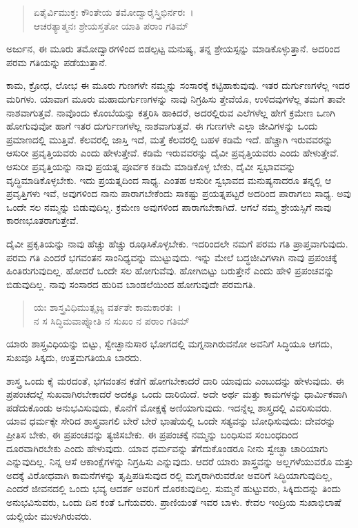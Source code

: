 \begin{verse}
ಏತೈರ್ವಿಮುಕ್ತಃ ಕೌಂತೇಯ ತಮೋದ್ವಾರೈಸ್ತ್ರಿಭಿರ್ನರಃ~।\\ಆಚರತ್ಯಾತ್ಮನಃ ಶ್ರೇಯಸ್ತತೋ ಯಾತಿ ಪರಾಂ ಗತಿಮ್ 
\end{verse}

{\small ಅರ್ಜುನ, ಈ ಮೂರು ತಮೋದ್ವಾರಗಳಿಂದ ಬಿಡಲ್ಪಟ್ಟ ಮನುಷ್ಯ, ತನ್ನ ಶ್ರೇಯಸ್ಸನ್ನು ಮಾಡಿಕೊಳ್ಳುತ್ತಾನೆ. ಅದರಿಂದ ಪರಮ ಗತಿಯನ್ನು ಪಡೆಯುತ್ತಾನೆ.}

ಕಾಮ, ಕ್ರೋಧ, ಲೋಭ ಈ ಮೂರು ಗುಣಗಳೇ ನಮ್ಮನ್ನು ಸಂಸಾರಕ್ಕೆ ಕಟ್ಟಿಹಾಕುವುವು. ಇತರ ದುರ್ಗುಣಗಳೆಲ್ಲ ಇದರ ಮರಿಗಳು. ಯಾವಾಗ ಮೂರು ಮಹಾದುರ್ಗುಣಗಳನ್ನು ನಾವು ನಿಗ್ರಹಿಸು ತ್ತೇವೆಯೊ, ಉಳಿದವುಗಳೆಲ್ಲ ತಮಗೆ ತಾವೇ ನಾಶವಾಗುತ್ತವೆ. ನಾವೊಂದು ಕೊಂಬೆಯನ್ನು ಕತ್ತರಿಸಿ ಹಾಕಿದರೆ, ಅದರಲ್ಲಿರುವ ಎಲೆಗಳೆಲ್ಲ ಹೇಗೆ ಕ್ರಮೇಣ ಒಣಗಿ ಹೋಗುವುವೋ ಹಾಗೆ ಇತರ ದುರ್ಗುಣಗಳೆಲ್ಲ ನಾಶವಾಗುತ್ತವೆ. ಈ ಗುಣಗಳೇ ಎಲ್ಲಾ ಜೀವಿಗಳನ್ನು ಒಂದು ಪ್ರಮಾಣದಲ್ಲಿ ಮುತ್ತಿವೆ. ಕೆಲವರಲ್ಲಿ ಜಾಸ್ತಿ ಇದೆ, ಮತ್ತೆ ಕೆಲವರಲ್ಲಿ ಬಹಳ ಕಡಿಮೆ ಇದೆ. ಹೆಚ್ಚಾಗಿ ಇರುವವರನ್ನು ಆಸುರೀ ಪ್ರವೃತ್ತಿಯವರು ಎಂದು ಹೇಳುತ್ತೇವೆ. ಕಡಿಮೆ ಇರುವವರನ್ನು ದೈವೀ ಪ್ರವೃತ್ತಿಯವರು ಎಂದು ಹೇಳುತ್ತೇವೆ. ಆಸುರೀ ಪ್ರವೃತ್ತಿಯನ್ನು ನಾವು ಪ್ರಯತ್ನ ಪೂರ್ವಕ ಕಡಿಮೆ ಮಾಡಿಕೊಳ್ಳ ಬೇಕು, ದೈವೀ ಸ್ವಭಾವವನ್ನು ವೃದ್ಧಿಮಾಡಿಕೊಳ್ಳಬೇಕು. ಇದು ಪ್ರಯತ್ನದಿಂದ ಸಾಧ್ಯ. ಎಂತಹ ಆಸುರೀ ಸ್ವಭಾವದ ಮನುಷ್ಯನಾದರೂ ತನ್ನಲ್ಲಿ ಆ ಪ್ರವೃತ್ತಿಗಳು ಇವೆ, ಅವುಗಳಿಂದ ನಾನು ಪಾರಾಗಬೇಕೆಂದು ಸಾಕಷ್ಟು ಪ್ರಯತ್ನಪಟ್ಟರೆ ಅದರಿಂದ ಪಾರಾಗಲು ಸಾಧ್ಯ. ಅವು ಒಂದೇ ಸಲ ನಮ್ಮನ್ನು ಬಿಡುವುದಿಲ್ಲ. ಕ್ರಮೇಣ ಅವುಗಳಿಂದ ಪಾರಾಗಬೇಕಾಗಿದೆ. ಆಗಲೆ ನಮ್ಮ ಶ್ರೇಯಸ್ಸಿಗೆ ನಾವು ಕಾರಣಭೂತರಾಗುತ್ತೇವೆ.

ದೈವೀ ಪ್ರಕೃತಿಯನ್ನು ನಾವು ಹೆಚ್ಚು ಹೆಚ್ಚು ರೂಢಿಸಿಕೊಳ್ಳಬೇಕು. ಇದರಿಂದಲೇ ನಮಗೆ ಪರಮ ಗತಿ ಪ್ರಾಪ್ತವಾಗುವುದು. ಪರಮ ಗತಿ ಎಂದರೆ ಭಗವಂತನ ಸಾಂನಿಧ್ಯವನ್ನು ಮುಟ್ಟುವುದು. ಇನ್ನು ಮೇಲೆ ಬದ್ಧಜೀವಿಗಳಾಗಿ ನಾವು ಪ್ರಪಂಚಕ್ಕೆ ಹಿಂತಿರುಗುವುದಿಲ್ಲ. ಹೋದರೆ ಒಂದೇ ಸಲ ಹೋಗುವೆವು. ಹೋಗಿಬಿಟ್ಟು ಬರುತ್ತೇನೆ ಎಂದು ಹೇಳಿ ಪ್ರಪಂಚವನ್ನು ಬಿಡುವುದಿಲ್ಲ. ನಾವು ಸಂಸಾರದ ಹುರಿವ ಬಾಂಡಲೆಯಿಂದ ಹೋಗುವುದೇ ಪರಮಗತಿ.

\begin{verse}
ಯಃ ಶಾಸ್ತ್ರವಿಧಿಮುತ್ಸೃಜ್ಯ ವರ್ತತೇ ಕಾಮಕಾರತಃ~।\\ನ ಸ ಸಿದ್ಧಿಮವಾಪ್ನೋತಿ ನ ಸುಖಂ ನ ಪರಾಂ ಗತಿಮ್ 
\end{verse}

{\small ಯಾರು ಶಾಸ್ತ್ರವಿಧಿಯನ್ನು ಬಿಟ್ಟು, ಸ್ವೇಚ್ಛಾನುಸಾರ ಭೋಗದಲ್ಲಿ ಮಗ್ನನಾಗಿರುವನೋ ಅವನಿಗೆ ಸಿದ್ಧಿಯೂ ಆಗದು, ಸುಖವೂ ಸಿಕ್ಕದು, ಉತ್ತಮಗತಿಯೂ ಬಾರದು.}

ಶಾಸ್ತ್ರ ಒಂದು ಕೈ ಮರದಂತೆ, ಭಗವಂತನ ಕಡೆಗೆ ಹೋಗಬೇಕಾದರೆ ದಾರಿ ಯಾವುದು ಎಂಬುದನ್ನು ಹೇಳುವುದು. ಈ ಪ್ರಪಂಚದಲ್ಲೆ ಸುಖವಾಗಿರಬೇಕಾದರೆ ಅದಕ್ಕೂ ಒಂದು ದಾರಿಯಿದೆ. ಅದೇ ಅರ್ಥ ಮತ್ತು ಕಾಮಗಳನ್ನು ಧಾರ್ಮಿಕವಾಗಿ ಪಡೆದುಕೊಂಡು ಅನುಭವಿಸುವುದು, ಕೊನೆಗೆ ಮೋಕ್ಷಕ್ಕೆ ಅಣಿಯಾಗುವುದು. ಇದನ್ನೆಲ್ಲ ಶಾಸ್ತ್ರದಲ್ಲಿ ವಿವರಿಸುವರು. ಯಾವ ಧರ್ಮಕ್ಕೇ ಸೇರಿದ ಶಾಸ್ತ್ರವಾಗಲಿ ಬೇರೆ ಬೇರೆ ಭಾಷೆಯಲ್ಲಿ ಒಂದೇ ಸತ್ಯವನ್ನು ಬೋಧಿಸುವುದು: ದೇವರನ್ನು ಪ್ರೀತಿಸ ಬೇಕು, ಈ ಪ್ರಪಂಚವನ್ನು ತ್ಯಜಿಸಬೇಕು. ಈ ಪ್ರಪಂಚಕ್ಕೆ ನಮ್ಮನ್ನು ಬಂಧಿಸುವ ಸಂಬಂಧದಿಂದ ದೂರವಾಗಿರಬೇಕು ಎಂದು ಹೇಳುವುದು. ಯಾವ ಧರ್ಮವನ್ನು ತೆಗೆದುಕೊಂಡರೂ ನೀನು ಸ್ವೇಚ್ಛಾ ಚಾರಿಯಾಗು ಎನ್ನುವುದಿಲ್ಲ. ನಿನ್ನ ಆಸೆ ಆಕಾಂಕ್ಷೆಗಳನ್ನು ನಿಗ್ರಹಿಸು ಎನ್ನುವುದು. ಆದರೆ ಯಾರು ಶಾಸ್ತ್ರವನ್ನು ಅಲ್ಲಗಳೆಯುವರೊ ಮತ್ತು ಅದಕ್ಕೆ ವಿರೋಧವಾಗಿ ಕಾಮನೆಗಳನ್ನು ತೃಪ್ತಿಪಡಿಸುವುದ ರಲ್ಲಿ ಮಗ್ನರಾಗಿರುವರೋ ಅವರಿಗೆ ಸಿದ್ಧಿಯಾಗುವುದಿಲ್ಲ, ಎಂದರೆ ಜೀವನದಲ್ಲಿ ಒಂದು ಭವ್ಯ ಆದರ್ಶ ಅವರಿಗೆ ದೊರಕುವುದಿಲ್ಲ. ಸುಮ್ಮನೆ ಹುಟ್ಟುವರು, ಸಿಕ್ಕಿದುದನ್ನು ತಿಂದು ಅನುಭವಿಸುವರು, ಒಂದು ದಿನ ಕಂತೆ ಒಗೆಯವರು. ಪ್ರಾಣಿಯಂತೆ ಇವರ ಬಾಳು. ಕೇವಲ ಇಂದ್ರಿಯ ಸುಖಾಭಿಲಾಷೆ ಯಲ್ಲಿಯೇ ಮುಳುಗಿರುವರು.

